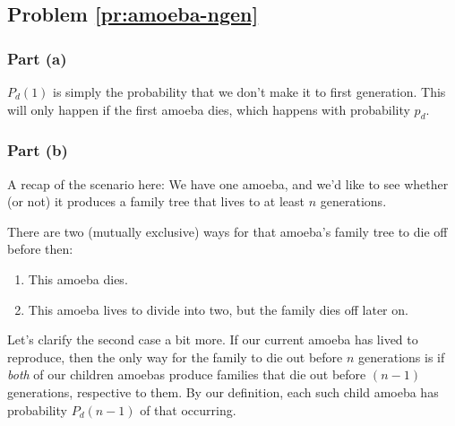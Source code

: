 

 



\subsection{Problem \ref{pr:amoeba-ngen}}

\subsubsection{Part (a)}

$P_d(1)$ is simply the probability that we don't make it to first generation. This will only happen if the first amoeba dies, which happens with probability $p_d$.



\subsubsection{Part (b)}

A recap of the scenario here: We have one amoeba, and we'd like to see whether (or not) it produces a family tree that lives to at least $n$ generations.

There are two (mutually exclusive) ways for that amoeba's family tree to die off before then: 
\begin{enumerate}
\item This amoeba dies.
\item This amoeba lives to divide into two, but the family dies off later on.
\end{enumerate} \hfill

Let's clarify the second case a bit more. If our current amoeba has lived to reproduce, then the only way for the family to die out before $n$ generations is if \emph{both} of our children amoebas produce families that die out before $(n-1)$ generations, respective to them. By our definition, each such child amoeba has probability $P_d(n-1)$ of that occurring.


